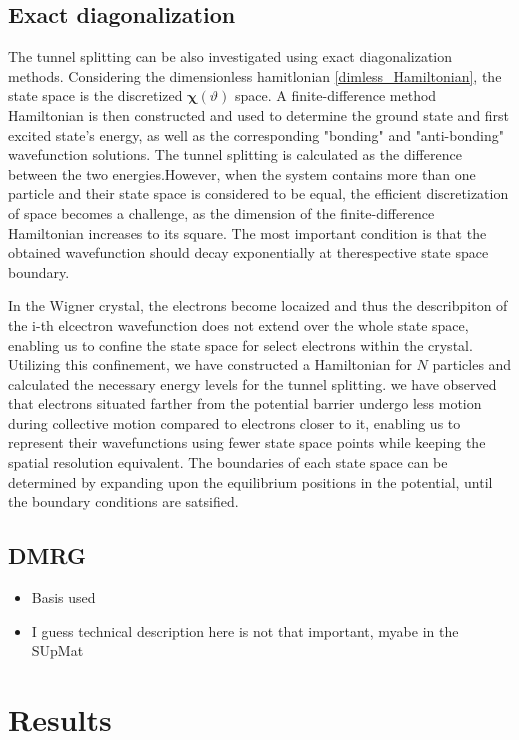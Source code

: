 \documentclass[prb,twocolumn,showpacs,preprintnumbers,amsmath,amssymb, superscriptaddress]{revtex4-2}
\newcommand{\1}{{1\hspace*{-0.5ex} \textrm{l} \hspace*{0.5ex}}}
\begin{document}
\subsection{Exact diagonalization}
The tunnel splitting can be also investigated using exact diagonalization methods. Considering the dimensionless hamitlonian \eqref{dimless_Hamiltonian}, the state space is the discretized $\mathbold{\chi}(\vartheta)$ space.  A finite-difference method Hamiltonian is then constructed and used to determine the ground state and first excited state's energy, as well as the corresponding "bonding" and "anti-bonding" wavefunction solutions. The tunnel splitting is calculated as the difference between the two energies.However, when the system contains more than one particle and their state space is considered to be equal, the efficient discretization of space becomes a challenge, as the dimension of the finite-difference Hamiltonian increases to its square. The most important condition is that the obtained wavefunction should decay exponentially at therespective state space boundary. 

In the Wigner crystal, the electrons become locaized and thus the describpiton of the i-th elcectron wavefunction does not extend over the whole state space, enabling us to confine the state space for select electrons within the crystal. Utilizing this confinement, we have constructed a Hamiltonian for $N$ particles and calculated the necessary energy levels for the tunnel splitting. we have observed that electrons situated farther from the potential barrier undergo less motion during collective motion compared to electrons closer to it, enabling us to represent their wavefunctions using fewer state space points while keeping the spatial resolution equivalent. The boundaries of each state space can be determined by expanding upon the equilibrium positions in the potential, until the boundary conditions are satsified.





\subsection{DMRG}
\begin{itemize}
\item Basis used
\item I guess technical description here is not that important, myabe in the SUpMat
\end{itemize}


\section{Results}
\end{document}
